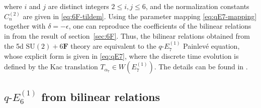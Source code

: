 \documentclass[11pt, a4paper]{article}
\theoremstyle{definition}
\begin{document}
where $i$ and $j$ are distinct integers $ 2 \leq i,  j \leq 6 $, and the normalization constants $ C_n^{(2)} $ are given in \eqref{eq:6F-tildem}. Using the parameter mapping \eqref{eq:qE7-mapping} together with $ \delta=-\epsilon $, one can reproduce the coefficients of the bilinear relations in \cite{Masuda:2009} from the result of section~\ref{sec:6F}. Thus, the bilinear relations obtained from the 5d $ \mathrm{SU}(2)+6\mathbf{F} $ theory are equivalent to the $ q\text{-}E_7^{(1)} $ Painlev\'e equation, whose explicit form is given in \eqref{eq:qE7}, where the discrete time evolution is defined by the Kac translation $ T_{\alpha_7} \in W(E_7^{(1)}) $. The details can be found in \cite{Masuda:2009}.


\subsection{\texorpdfstring{$ q\text{-}E_6^{(1)} $}{q-E6(1)} from bilinear relations} \label{app:E6}
\end{document}
